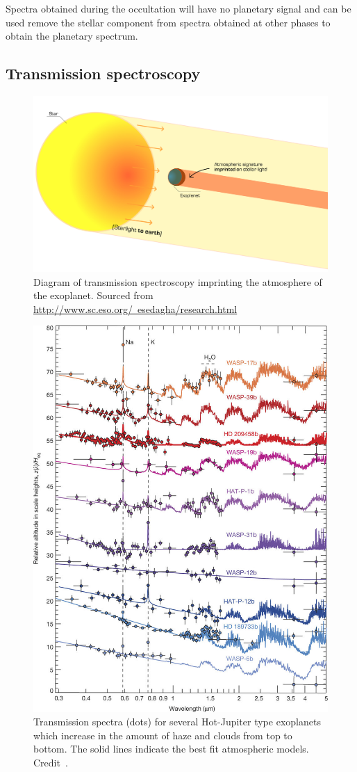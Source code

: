 Spectra obtained during the occultation will have no planetary signal and can be used remove the stellar component from spectra obtained at other phases to obtain the planetary spectrum.


\subsection{Transmission spectroscopy}
\label{subsec:transmission_spectroscopy}
\begin{figure}
    \centering
    \includegraphics[width=0.65\linewidth]{figures/introduction/transmission_spectroscopy}
    \caption[Transmission spectroscopy diagram.]{Diagram of transmission spectroscopy imprinting the atmosphere of the exoplanet.
    Sourced from \href{http://www.sc.eso.org/~esedagha/research.html}{http://www.sc.eso.org/~esedagha/research.html}}
    \label{fig:transmissionspectroscopy}
\end{figure}

\begin{figure}
    \centering
    \includegraphics[width=0.6\linewidth]{figures/introduction/transmissionSpec_Sing2016}
    \caption[Transmission spectra for several Hot-Jupiter exoplanets.]{Transmission spectra (dots) for several Hot-Jupiter type exoplanets which increase in the amount of haze and clouds from top to bottom.
    The solid lines indicate the best fit atmospheric models.
    Credit~\citet{sing_continuum_2016}.}
    \label{fig:transmissionspecsing2016}
\end{figure}


